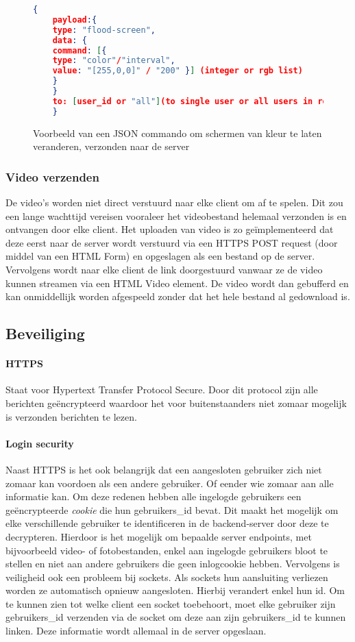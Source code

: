 \begin{figure} [h]
    \begin{lstlisting}[language=json,firstnumber=1]
    {
    payload:{
    type: "flood-screen",
    data: {
    command: [{
    type: "color"/"interval",
    value: "[255,0,0]" / "200" }] (integer or rgb list)
    }
    }
    to: [user_id or "all"](to single user or all users in room)
    }

    \end{lstlisting}
    \caption{Voorbeeld van een JSON commando om schermen van kleur te laten veranderen, verzonden naar de server} \label{jsonScreenCommand}
\end{figure}

\subsubsection{Video verzenden}
De video's worden niet direct verstuurd naar elke client om af te spelen. Dit zou een lange wachttijd vereisen vooraleer het videobestand helemaal verzonden is en ontvangen door elke client.
Het uploaden van video is zo geïmplementeerd dat deze eerst naar de server wordt verstuurd via een HTTPS POST request (door middel van een HTML Form) en opgeslagen als een bestand op de server. Vervolgens wordt naar elke client de link doorgestuurd vanwaar ze de video kunnen streamen via een HTML Video element. De video wordt dan gebufferd en kan onmiddellijk worden afgespeeld zonder dat het hele bestand al gedownload is.
\newpage
\subsection{Beveiliging}
\paragraph{HTTPS} Staat voor Hypertext Transfer Protocol Secure. Door dit protocol zijn alle berichten geëncrypteerd waardoor het voor buitenstaanders niet zomaar mogelijk is verzonden berichten te lezen.
\paragraph{Login security} Naast HTTPS is het ook belangrijk dat een aangesloten gebruiker zich niet zomaar kan voordoen als een andere gebruiker. Of eender wie zomaar aan alle informatie kan. Om deze redenen hebben alle ingelogde gebruikers een geëncrypteerde \textit{cookie} die hun gebruikers\_id bevat. Dit maakt het mogelijk om elke verschillende gebruiker te identificeren in de backend-server door deze te decrypteren. Hierdoor is het mogelijk om bepaalde server endpoints, met bijvoorbeeld video- of fotobestanden, enkel aan ingelogde gebruikers bloot te stellen en niet aan andere gebruikers die geen inlogcookie hebben.
Vervolgens is veiligheid ook een probleem bij sockets. Als sockets hun aansluiting verliezen worden ze automatisch opnieuw aangesloten. Hierbij verandert enkel hun id. Om te kunnen zien tot welke client een socket toebehoort, moet elke gebruiker zijn gebruikers\_id verzenden via de socket om deze aan zijn gebruikers\_id te kunnen linken. Deze informatie wordt allemaal in de server opgeslaan.

